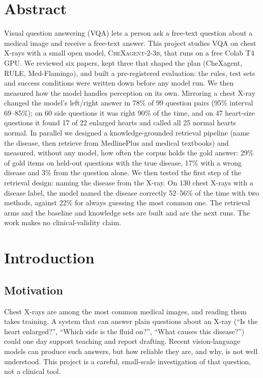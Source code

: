 \documentclass[11pt,a4paper]{article}
\begin{document}
\section*{Abstract}
Visual question answering (VQA) lets a person ask a free-text question about a medical image and receive a free-text answer.
This project studies VQA on chest X-rays with a small open model, \textsc{CheXagent-2-3b}, that runs on a free Colab T4 GPU.
We reviewed six papers, kept three that shaped the plan (CheXagent, RULE, Med-Flamingo), and built a pre-registered
evaluation: the rules, test sets and success conditions were written down before any model run.
We then measured how the model handles perception on its own. Mirroring a chest X-ray changed the model's left/right answer
in 78\% of 99 question pairs (95\% interval 69--85\%); on 60 side questions it was right 90\% of the time, and on 47 heart-size
questions it found 17 of 22 enlarged hearts and called all 25 normal hearts normal.
In parallel we designed a knowledge-grounded retrieval pipeline (name the disease, then retrieve from MedlinePlus and medical
textbooks) and measured, without any model, how often the corpus holds the gold answer: 29\% of gold items on held-out
questions with the true disease, 17\% with a wrong disease and 3\% from the question alone.
We then tested the first step of the retrieval design: naming the disease from the X-ray. On 130 chest X-rays with a disease label,
the model named the disease correctly 52--56\% of the time with two methods, against 22\% for always guessing the most common one.
The retrieval arms and the baseline and knowledge sets are built and are the next runs. The work makes no clinical-validity claim.

{\setlength{\parskip}{0pt}\tableofcontents}
\clearpage
\listoffigures
\clearpage
{}

\section{Introduction}
\subsection{Motivation}
Chest X-rays are among the most common medical images, and reading them takes training.
A system that can answer plain questions about an X-ray (``Is the heart enlarged?'', ``Which side is the fluid on?'',
``What causes this disease?'') could one day support teaching and report drafting.
Recent vision-language models can produce such answers, but how reliable they are, and why, is not well understood.
This project is a careful, small-scale investigation of that question, not a clinical tool.
\end{document}
